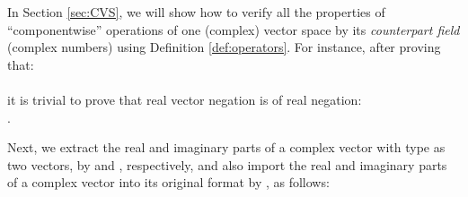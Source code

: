 \documentclass{llncs}
\begin{document}
{In Section \ref{sec:CVS}, we will show how to verify all the properties of ``componentwise'' operations of one (complex) vector space by its \emph{counterpart field} (complex numbers) using Definition \ref{def:operators}. For instance, after proving that: \vspace{.2cm}\\
\noindent  {} \vspace{.25cm}\\
 \noindent it is trivial to prove that real vector negation is  of real negation: \vspace{.2cm}\\
\noindent {}. \vspace{.25cm}

Next, we extract the real and imaginary parts of a complex vector with type  as two  vectors, by  and , respectively, and also import the real and imaginary parts of a complex vector into its original format by , as follows:

\begin{definition} \label{def:mapping} \vspace{.15cm}\\ 
  \vspace{.08cm}\\
  \vspace{.08cm} \\
\\
\end{definition}

}
\end{document}
